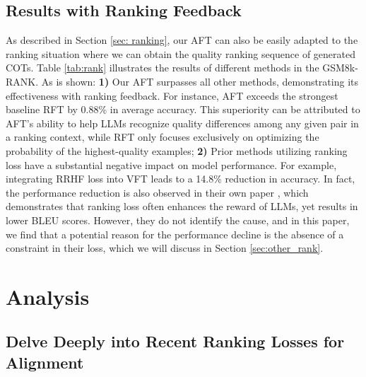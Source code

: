 \subsection{Results with Ranking Feedback}

As described in Section \ref{sec: ranking}, our AFT can also be easily adapted to the ranking situation where we can obtain the quality ranking sequence of generated COTs. Table \ref{tab:rank} illustrates the results of different methods in the GSM8k-RANK. As is shown:
\textbf{1)} Our AFT surpasses all other methods, demonstrating its effectiveness with ranking feedback. For instance, AFT exceeds the strongest baseline RFT by 0.88\% in average accuracy. This superiority can be attributed to AFT's ability to help LLMs recognize quality differences among any given pair in a ranking context, while RFT only focuses exclusively on optimizing the probability of the highest-quality examples;
\textbf{2)} Prior methods utilizing ranking loss have a substantial negative impact on model performance. For example, integrating RRHF loss into VFT leads to a 14.8\% reduction in accuracy. In fact, the performance reduction is also observed in their own paper \citep{song2023preference}, which demonstrates that ranking loss often enhances the reward of LLMs, yet results in lower BLEU scores. However, they do not identify the cause, and in this paper, we find that a potential reason for the performance decline is the absence of a constraint in their loss, which we will discuss in Section \ref{sec:other_rank}. 

\section{Analysis}

\subsection{Delve Deeply into Recent Ranking Losses for Alignment}

